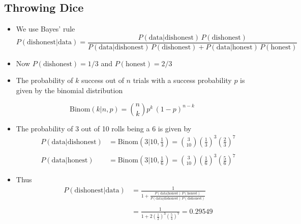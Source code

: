\documentclass[11pt]{article}
\begin{document}
\subsection{Throwing Dice}
\label{sec:orgca29903}
\begin{itemize}
\item We use Bayes' rule
$$ P(\text{dishonest}|\text{data}) = \frac{P(\text{data}|\text{dishonest})
      \,P(\text{dishonest} )}
      {P(\text{data}|\text{dishonest})\,P(\text{dishonest} ) +
      P(\text{data}|\text{honest})\,P(\text{honest})} $$
\item Now \(P(\text{dishonest} )=1/3\) and \(P(\text{honest})=2/3\)
\item The probability of \(k\) success out of \(n\) trials with a success
probability \(p\) is given by the binomial distribution
\end{itemize}
$$\mathrm{Binom}(k|n,p) = \binom{n}{k} p^k\,(1-p)^{n-k} $$
\begin{itemize}
\item The probability of 3 out of 10 rolls being a 6 is given by
\begin{align*}
P(\text{data}|\text{dishonest}) &=
\mathrm{Binom}(3|10,\tfrac{1}{3}) = \binom{3}{10}
\left(\frac{1}{3}\right)^3  \left(\frac{2}{3}\right)^7\\ \\
P(\text{data}|\text{honest}) &=
\mathrm{Binom}(3|10,\tfrac{1}{6}) =  \binom{3}{10}
\left(\frac{1}{6}\right)^3  \left(\frac{5}{6}\right)^7
\end{align*}
\item Thus
\begin{align*}
P(\text{dishonest}|\text{data}) &= \frac{1}{1 +
  \frac{P(\text{data}|\text{honest})\,P(\text{honest})}
  {P(\text{data}|\text{dishonest})\,P(\text{dishonest})}} \\ \\
&= \frac{1}{1 + 2 \left(\frac{1}{2}\right)^3
  \left(\frac{5}{4}\right)^7} = 0.29549 \\
\end{align*}
\end{itemize}
\end{document}
